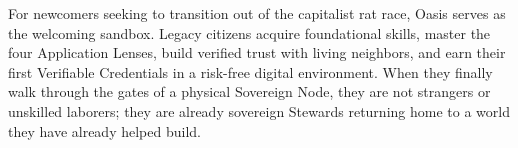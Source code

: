 For newcomers seeking to transition out of the capitalist rat race, Oasis serves as the welcoming sandbox. Legacy citizens acquire foundational skills, master the four Application Lenses, build verified trust with living neighbors, and earn their first Verifiable Credentials in a risk-free digital environment. When they finally walk through the gates of a physical Sovereign Node, they are not strangers or unskilled laborers; they are already sovereign Stewards returning home to a world they have already helped build.
